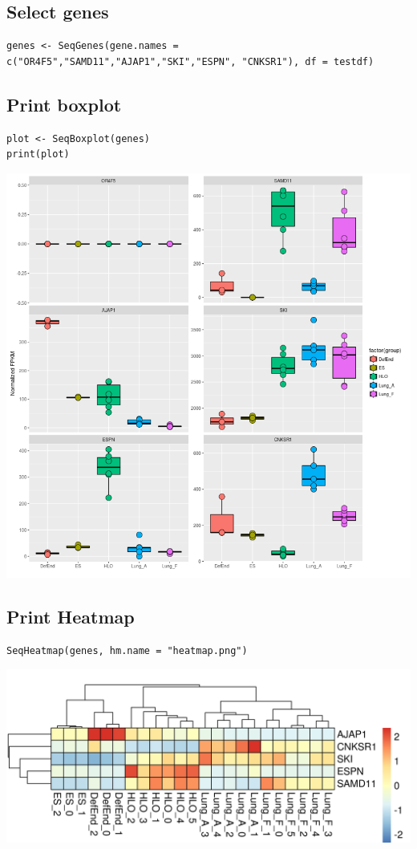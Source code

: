 \documentclass[11pt]{article}
\begin{document}
\subsection{Select genes}
\label{sec-4-2}
\begin{verbatim}
genes <- SeqGenes(gene.names = c("OR4F5","SAMD11","AJAP1","SKI","ESPN", "CNKSR1"), df = testdf)
\end{verbatim}

\subsection{Print boxplot}
\label{sec-4-3}
\begin{verbatim}
plot <- SeqBoxplot(genes)
print(plot)
\end{verbatim}

\includegraphics[width=.9\linewidth]{boxplots.png}
\subsection{Print Heatmap}
\label{sec-4-4}
\begin{verbatim}
SeqHeatmap(genes, hm.name = "heatmap.png")
\end{verbatim}

\includegraphics[width=.9\linewidth]{heatmap.png}
\end{document}
